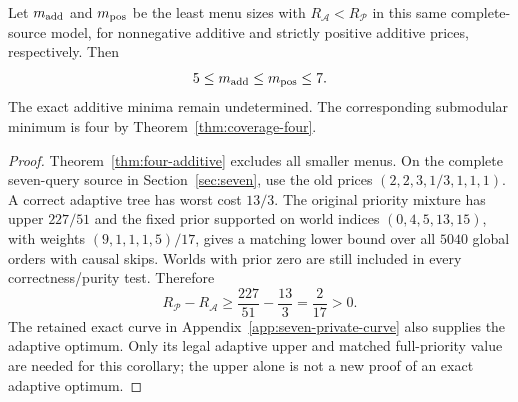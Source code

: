 \begin{corollary}
\label{cor:additive-first-interval}
Let $m_{\rm add}$ and $m_{\rm pos}$ be the least menu sizes with
$R_{\mathcal A}<R_{\mathcal P}$ in this same complete-source model,
for nonnegative additive and strictly positive additive prices,
respectively. Then
\[
 5\leq m_{\rm add}\leq m_{\rm pos}\leq7.
\]
The exact additive minima remain undetermined. The corresponding
submodular minimum is four by Theorem~\ref{thm:coverage-four}.
\end{corollary}
\begin{proof}
Theorem~\ref{thm:four-additive} excludes all smaller menus. On the
complete seven-query source in Section~\ref{sec:seven}, use the old
prices $(2,2,3,1/3,1,1,1)$. A correct adaptive tree has worst cost
$13/3$. The original priority mixture has upper $227/51$ and the
fixed prior supported on world indices $(0,4,5,13,15)$, with
weights $(9,1,1,1,5)/17$, gives a matching lower bound over all
$5040$ global orders with causal skips. Worlds with prior zero
are still included in every correctness/purity test. Therefore
\[
 R_{\mathcal P}-R_{\mathcal A}\geq
  \frac{227}{51}-\frac{13}{3}=\frac{2}{17}>0.
\]
The retained exact curve in Appendix~\ref{app:seven-private-curve}
also supplies the adaptive optimum. Only its legal adaptive upper
and matched full-priority value are needed for this corollary;
the upper alone is not a new proof of an exact adaptive optimum.
\end{proof}


